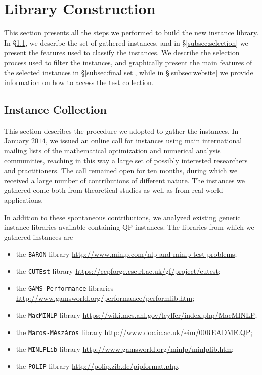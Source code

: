 \section{Library Construction}\label{sec:lib}

This section presents all the steps we performed to build
the new instance library. In \S\ref{subsec:instColl}, we describe the set
of gathered instances, and
in \S\ref{subsec:selection} we present the features used to
classify the instances.
We describe the selection process used to filter the instances, and
graphically present the main features of the selected instances in
\S\ref{subsec:final set}, while in \S\ref{subsec:website}
we provide information on how to access the test collection.

\subsection{Instance Collection}\label{subsec:instColl}

This section describes the procedure we adopted to gather the
instances. In January $2014$, we issued an online call for instances
using main international mailing lists of the mathematical
optimization and numerical analysis communities, reaching in this way
a {large set of possibly interested} researchers and practitioners.
The call remained open for ten months, during which we received a large
number of contributions of different nature. The instances we gathered
come both from theoretical studies as well as from real-world
applications.


In addition to these spontaneous contributions, we analyzed existing generic
instance libraries available  containing QP
instances. The libraries from which we gathered instances are
%
\begin{itemize}
 \item the \texttt{BARON} library
 \url{http://www.minlp.com/nlp-and-minlp-test-problems};
%
\item the \texttt{CUTEst} library
 \url{https://ccpforge.cse.rl.ac.uk/gf/project/cutest};
%
\item the \texttt{GAMS Performance} libraries
 \url{http://www.gamsworld.org/performance/performlib.htm};
%
\item the \texttt{MacMINLP} library
 \url{https://wiki.mcs.anl.gov/leyffer/index.php/MacMINLP};
%
\item the \texttt{Maros-M{\'e}sz{\'a}ros} library
 \url{http://www.doc.ic.ac.uk/~im/00README.QP};
%
\item the \texttt{MINLPLib} library
 \url{http://www.gamsworld.org/minlp/minlplib.htm};
%
\item the \texttt{POLIP} library
 \url{http://polip.zib.de/pipformat.php}.
\end{itemize}

